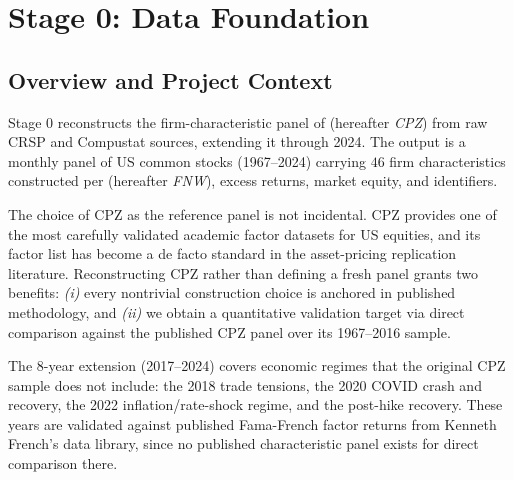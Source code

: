 %
%
%

\section{Stage 0: Data Foundation}
\label{sec:stage0}

\subsection{Overview and Project Context}
\label{subsec:stage0-context}

Stage 0 reconstructs the firm-characteristic panel of \cite{ChenPelgerZhu2024}
(hereafter \emph{CPZ}) from raw CRSP and Compustat sources, extending it
through 2024. The output is a monthly panel of US common stocks
(1967--2024) carrying \(46\) firm characteristics constructed per
\cite{FreybergerNeuhierlWeber2020} (hereafter \emph{FNW}), excess returns,
market equity, and identifiers.

The choice of CPZ as the reference panel is not incidental. CPZ provides
one of the most carefully validated academic factor datasets for US
equities, and its factor list has become a de facto standard in the
asset-pricing replication literature. Reconstructing CPZ rather than
defining a fresh panel grants two benefits: \emph{(i)} every nontrivial
construction choice is anchored in published methodology, and \emph{(ii)}
we obtain a quantitative validation target via direct comparison against
the published CPZ panel over its 1967--2016 sample.

The 8-year extension (2017--2024) covers economic regimes that the
original CPZ sample does not include: the 2018 trade tensions, the 2020
COVID crash and recovery, the 2022 inflation/rate-shock regime, and the
post-hike recovery. These years are validated against published
Fama-French factor returns from Kenneth French's data library, since
no published characteristic panel exists for direct comparison there.

